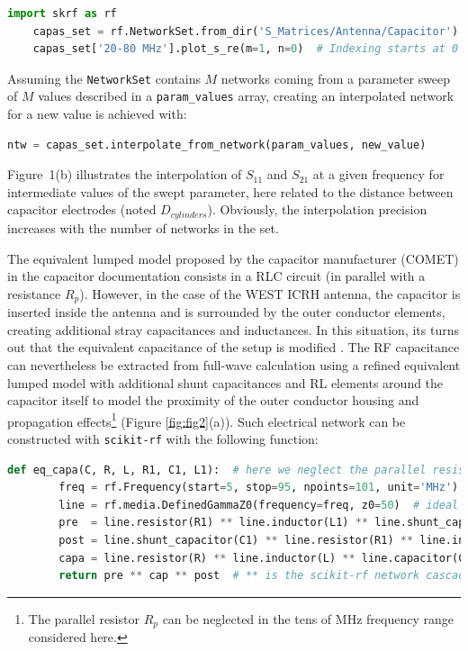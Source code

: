 \documentclass[%
aip,
cp,  %
amsmath,amssymb,%
reprint,%
]{revtex4-2}
\begin{document}
	\begin{lstlisting}[language=Python]
	import skrf as rf
	capas_set = rf.NetworkSet.from_dir('S_Matrices/Antenna/Capacitor')
	capas_set['20-80 MHz'].plot_s_re(m=1, n=0)  # Indexing starts at 0 in Python	\end{lstlisting}
	
	Assuming the \texttt{NetworkSet} contains $M$ networks coming from a parameter sweep of $M$ values described in a \texttt{param\_values} array, creating an interpolated network for a new value is achieved with:
	
	\begin{lstlisting}[language=Python]
	ntw = capas_set.interpolate_from_network(param_values, new_value)	\end{lstlisting}
	
	Figure~1(b) illustrates the interpolation of $S_{11}$ and $S_{21}$ at a given frequency for intermediate values of the swept parameter, here related to the distance between capacitor electrodes (noted $D_{cylinders}$). Obviously, the interpolation precision increases with the number of networks in the set.
	
	The equivalent lumped model proposed by the capacitor manufacturer (COMET) in the capacitor documentation consists in a RLC circuit (in parallel with a resistance $R_p$). 
	However, in the case of the WEST ICRH antenna, the capacitor is inserted inside the antenna and is surrounded by the outer conductor elements, creating additional stray capacitances and inductances. In this situation, its turns out that the equivalent capacitance of the setup is modified \cite{Helou2018PhD}. The RF capacitance can nevertheless be extracted from full-wave calculation using a refined equivalent lumped model with additional shunt capacitances and RL elements around the capacitor itself to model the proximity of the outer conductor housing and propagation effects\footnote{The parallel resistor $R_p$ can be neglected in the tens of MHz frequency range considered here.} (Figure \ref{fig:fig2}(a)). Such electrical network can be constructed with \texttt{scikit-rf} with the following function:
	
	\begin{lstlisting}[language=Python]
	def eq_capa(C, R, L, R1, C1, L1):  # here we neglect the parallel resistance R_p
		freq = rf.Frequency(start=5, stop=95, npoints=101, unit='MHz')
		line = rf.media.DefinedGammaZ0(frequency=freq, z0=50)  # ideal transmission line media
		pre  = line.resistor(R1) ** line.inductor(L1) ** line.shunt_capacitor(C1)
		post = line.shunt_capacitor(C1) ** line.resistor(R1) ** line.inductor(L1)
		capa = line.resistor(R) ** line.inductor(L) ** line.capacitor(C)
		return pre ** cap ** post  # ** is the scikit-rf network cascading operator	\end{lstlisting}
	
\end{document}
